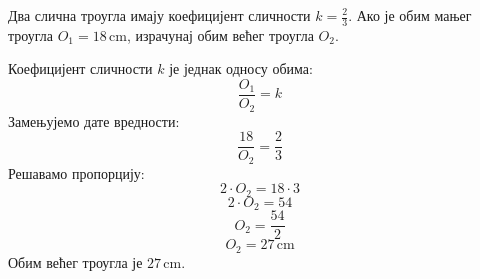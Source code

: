 \documentclass[11pt,a5paper,addpoints,noanswers]{exam}
\def\measure#1#2{#1 \, \mathrm{#2}}
\begin{document}
\begin{questions}
\question[4]
 Два слична троугла имају коефицијент сличности $k = \frac{2}{3}$. Ако је обим мањег троугла $O_1 = \measure{18}{cm}$, израчунај обим већег троугла $O_2$.
 \begin{solution}[\stretch 9] %
  Коефицијент сличности $k$ је једнак односу обима:
  $$ \frac{O_1}{O_2} = k $$
  Замењујемо дате вредности:
  $$ \frac{18}{O_2} = \frac{2}{3} $$
  Решавамо пропорцију:
  $$ 2 \cdot O_2 = 18 \cdot 3 $$
  $$ 2 \cdot O_2 = 54 $$
  $$ O_2 = \frac{54}{2} $$
  $$ O_2 = \measure{27}{cm} $$
  Обим већег троугла је $\measure{27}{cm}$.
 \end{solution}
 \answerline

\end{questions}
\end{document}
